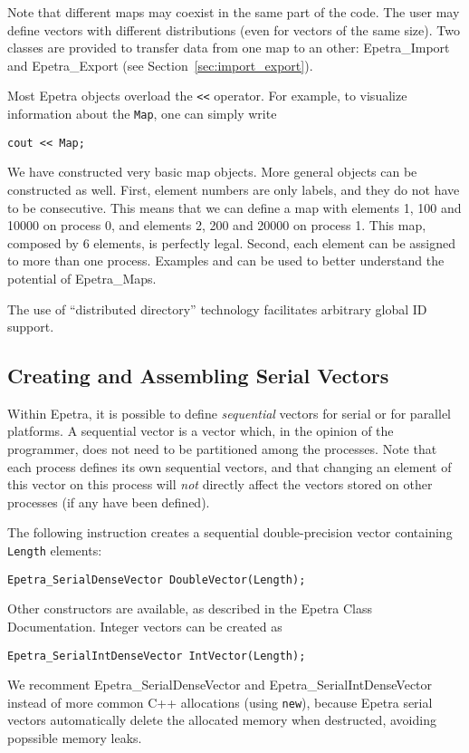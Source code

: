 \smallskip

Note that different maps may coexist in the same part of the code.  The
user may define vectors with different distributions (even for vectors
of the same size).  Two classes are provided to transfer data from one
map to an other: Epetra\_Import and Epetra\_Export (see
Section~\ref{sec:import_export}).

\begin{remark}
Most Epetra objects overload the \verb!<<! operator. For example, to
visualize information about the \verb!Map!, one can simply write
\begin{verbatim}
cout << Map;
\end{verbatim}
\end{remark}

We have constructed very basic map objects.  More general objects can be
constructed as well. First, element numbers are only labels, and they do
not have to be consecutive.  This means that we can define a map with
elements 1, 100 and 10000 on process 0, and elements 2, 200 and 20000 on
process 1. This map, composed by 6 elements, is perfectly legal. Second,
each element can be assigned to more than one process. Examples
 and  can be used to
better understand the potential of Epetra\_Maps.

\begin{remark}
  The use of ``distributed directory'' technology facilitates arbitrary
  global ID support.
\end{remark}


\subsection{Creating and Assembling Serial Vectors}
\label{sec:serial_vec}

Within Epetra, it is possible to define {\em sequential} vectors for
serial or for parallel platforms. A sequential vector is a vector which,
in the opinion of the programmer, does not need to be partitioned among
the processes.  Note that each process defines its own sequential
vectors, and that changing an element of this vector on this process
will {\em not} directly affect the vectors stored on other processes (if
any have been defined).

The following instruction creates a sequential double-precision vector
containing {\tt Length} elements:
\begin{verbatim}
Epetra_SerialDenseVector DoubleVector(Length);
\end{verbatim}
Other constructors are available, as described in the Epetra Class
Documentation.
Integer vectors can be created as
\begin{verbatim}
Epetra_SerialIntDenseVector IntVector(Length);
\end{verbatim}
We recomment Epetra\_SerialDenseVector and Epetra\_SerialIntDenseVector
instead of more common C++ allocations (using \verb!new!), because
Epetra serial vectors automatically delete the allocated memory when
destructed, avoiding popssible memory leaks. 

